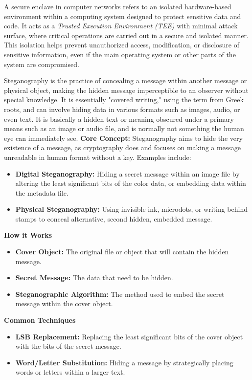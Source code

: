  A secure enclave in computer networks refers to an isolated hardware-based environment within a computing system designed to protect sensitive data and code. It acts as a \textit{ Trusted Execution Environment (TEE)} with minimal attack surface, where critical operations are carried out in a secure and isolated manner. This isolation helps prevent unauthorized access, modification, or disclosure of sensitive information, even if the main operating system or other parts of the system are compromised.

 Steganography is the practice of concealing a message within another message or physical object, making the hidden message imperceptible to an observer without special knowledge. It is essentially "covered writing," using the term from Greek roots, and can involve hiding data in various formats such as images, audio, or even text. It is basically a hidden text or meaning obscured under a primary means such as an image or audio file, and is normally not something the human eye can immediately see.
\textbf{Core Concept:} Steganography aims to hide the very existence of a message, as cryptography does and focuses on making a message unreadable in human format without a key. Examples include:
\begin{itemize}
    \item \textbf{Digital Steganography:} Hiding a secret message within an image file by altering the least significant bits of the color data, or embedding data within the metadata file.
    \item \textbf{Physical Steganography:} Using invisible ink, microdots, or writing behind stamps to conceal alternative, second hidden, embedded message.
\end{itemize}
\textbf{How it Works}
\begin{itemize}
    \item \textbf{Cover Object:} The original file or object that will contain the hidden message.
    \item \textbf{Secret Message:} The data that need to be hidden.
    \item \textbf{Steganographic Algorithm:} The method used to embed the secret message within the cover object.
\end{itemize}
\textbf{Common Techniques}
\begin{itemize}
    \item \textbf{LSB Replacement:} Replacing the least significant bits of the cover object with the bits of the secret message.
    \item \textbf{Word/Letter Substitution:} Hiding a message by strategically placing words or letters within a larger text.
\end{itemize}
